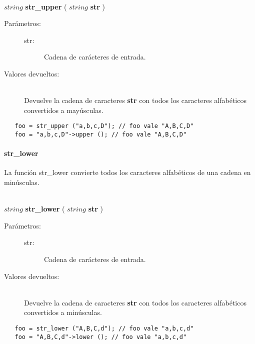 \begin{framed}
\hfill \\ $string$ \textbf{str\_upper} ( $string$ \textbf{str} )  
\begin{description}
\item [Parámetros:] \hfill 
   \begin{description}
   \item[str:] Cadena de carácteres de entrada.
   \end{description}
\item[Valores devueltos:] \hfill \\
   Devuelve la cadena de caracteres \textbf{str} con todos los caracteres alfabéticos convertidos a mayúsculas.
\end{description}
\end{framed}

\begin{lstlisting}
   foo = str_upper ("a,b,c,D"); // foo vale "A,B,C,D"
   foo = "a,b,c,D"->upper (); // foo vale "A,B,C,D" 
\end{lstlisting}

\paragraph{str\_lower}
La función str\_lower convierte todos los caracteres alfabéticos de una cadena en minúsculas. 

\begin{framed}
\hfill \\ $string$ \textbf{str\_lower} ( $string$ \textbf{str} )  
\begin{description}
\item [Parámetros:] \hfill 
   \begin{description}
   \item[str:] Cadena de carácteres de entrada.
   \end{description}
\item[Valores devueltos:] \hfill \\
   Devuelve la cadena de caracteres \textbf{str} con todos los caracteres alfabéticos convertidos a minúsculas.
\end{description}
\end{framed}

\begin{lstlisting}   
   foo = str_lower ("A,B,C,d"); // foo vale "a,b,c,d"
   foo = "A,B,C,d"->lower (); // foo vale "a,b,c,d" 
\end{lstlisting}

